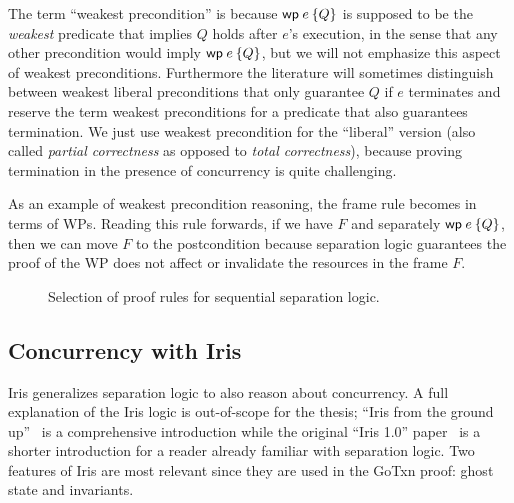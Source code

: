 The term ``weakest precondition'' is because $\wpre{e}{Q}$ is supposed to be the
\emph{weakest} predicate that implies $Q$ holds after $e$'s execution, in the
sense that any other precondition would imply $\wpre{e}{Q}$, but we will not
emphasize this aspect of weakest preconditions. Furthermore the literature will
sometimes distinguish between weakest liberal preconditions that only guarantee
$Q$ if $e$ terminates and reserve the term weakest preconditions for a predicate
that also guarantees termination. We just use weakest precondition for the
``liberal'' version (also called \emph{partial correctness} as opposed to
\emph{total correctness}), because proving termination in the presence of
concurrency is quite challenging.

As an example of weakest precondition reasoning, the frame rule becomes
 in terms of WPs. Reading this rule forwards, if we have $F$
and separately $\wpre{e}{Q}$, then we can move $F$ to the postcondition because
separation logic guarantees the proof of the WP does not affect or invalidate
the resources in the frame $F$.

\begin{figure}
\caption{Selection of proof rules for sequential separation logic.}
\label{fig:wp-rules}
\end{figure}

\subsection{Concurrency with Iris}

Iris generalizes separation logic to also reason about concurrency. A full
explanation of the Iris logic is out-of-scope for the thesis; ``Iris from the
ground up''~\cite{jung:iris-jfp} is a comprehensive introduction while the
original ``Iris 1.0'' paper~\cite{jung:iris-1} is a shorter introduction for a
reader already familiar with separation logic. Two features of Iris are most
relevant since they are used in the GoTxn proof: ghost state and invariants.


